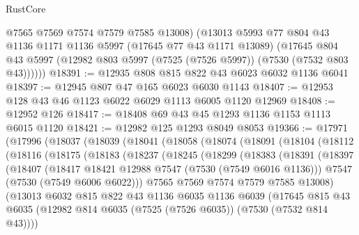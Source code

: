 \begin{lexlean}{RustCore}
\begin{coremodule}
        @7565
        @7569
        @7574
        @7579
        @7585
        @13008)
      (@13013
        @5993
        @77
        @804
        @43
        @1136
        @1171
        @1136
        @5997
        (@17645 @77 @43 @1171 @13089)
        (@17645 @804 @43 @5997 (@12982 @803 @5997 (@7525 (@7526 @5997)) (@7530 (@7532 @803 @43))))))
@18391 := @12935 @808 @815 @822 @43 @6023 @6032 @1136 @6041
@18397 := @12945 @807 @47 @165 @6023 @6030 @1143
@18407 := @12953 @128 @43 @46 @1123 @6022 @6029 @1113 @6005 @1120 @12969
@18408 := @12952 @126
@18417 := @18408 @69 @43 @45 @1293 @1136 @1153 @1113 @6015 @1120
@18421 := @12982 @125 @1293 @8049 @8053
@19366 := @17971
    (@17996
      (@18037
        (@18039
          (@18041
            (@18058
              (@18074
                (@18091
                  (@18104
                    (@18112
                      (@18116
                        (@18175
                          (@18183
                            (@18237
                              (@18245
                                (@18299
                                  (@18383
                                    (@18391
                                      (@18397
                                        (@18407
                                          (@18417 @18421 @12988 @7547 (@7530 (@7549 @6016 @1136)))
                                          @7547
                                          (@7530 (@7549 @6006 @6022)))
                                        @7565
                                        @7569
                                        @7574
                                        @7579
                                        @7585
                                        @13008)
                                      (@13013
                                        @6032
                                        @815
                                        @822
                                        @43
                                        @1136
                                        @6035
                                        @1136
                                        @6039
                                        (@17645
                                          @815
                                          @43
                                          @6035
                                          (@12982
                                            @814
                                            @6035
                                            (@7525 (@7526 @6035))
                                            (@7530 (@7532 @814 @43))))

\end{coremodule}
\end{lexlean}
